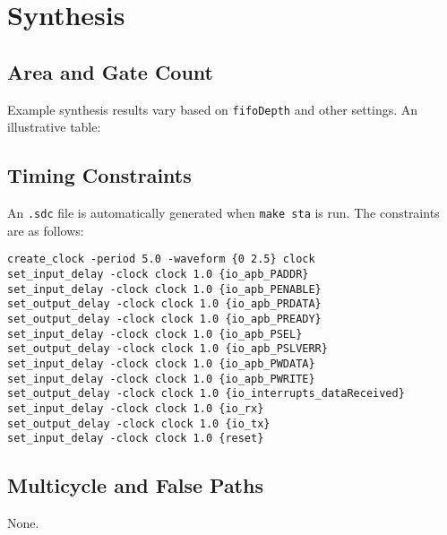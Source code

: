 \section{Synthesis}

\subsection{Area and Gate Count}
Example synthesis results vary based on \texttt{fifoDepth} and other settings. An illustrative table:



\subsection{Timing Constraints}
An \texttt{.sdc} file is automatically generated when \texttt{make sta} is run. The constraints are as follows:
\begin{verbatim}
create_clock -period 5.0 -waveform {0 2.5} clock
set_input_delay -clock clock 1.0 {io_apb_PADDR}
set_input_delay -clock clock 1.0 {io_apb_PENABLE}
set_output_delay -clock clock 1.0 {io_apb_PRDATA}
set_output_delay -clock clock 1.0 {io_apb_PREADY}
set_input_delay -clock clock 1.0 {io_apb_PSEL}
set_output_delay -clock clock 1.0 {io_apb_PSLVERR}
set_input_delay -clock clock 1.0 {io_apb_PWDATA}
set_input_delay -clock clock 1.0 {io_apb_PWRITE}
set_output_delay -clock clock 1.0 {io_interrupts_dataReceived}
set_input_delay -clock clock 1.0 {io_rx}
set_output_delay -clock clock 1.0 {io_tx}
set_input_delay -clock clock 1.0 {reset}
\end{verbatim}

\subsection{Multicycle and False Paths}
None.
